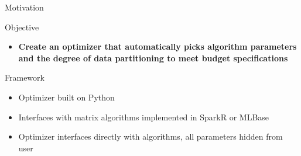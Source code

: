 \documentclass[final]{beamer}
\begin{document}
{\begin{frame}{}
\begin{center}
\begin{columns}[t]
\begin{column}{0.32\textwidth}
\begin{block}{\huge Motivation}
\end{block}

    \begin{block}{\huge Objective}
\vspace{.4cm}
\begin{itemize}
\item {\bf \large Create an optimizer that automatically picks algorithm parameters and the degree of data partitioning to meet budget specifications}
\end{itemize}

\vspace{.5cm}

\end{block}

\vspace{1.2cm}

    \begin{block}{\huge Framework}
\vspace{.5cm}
\begin{itemize}
\item Optimizer built on Python
\item Interfaces with matrix algorithms implemented in SparkR or MLBase
\item Optimizer interfaces directly with algorithms, all parameters hidden from user
\end{itemize}    
\begin{center}
\begin{figure}
\end{figure}
\end{center}
\end{block}


\vspace{1.2cm}

   
\end{column}


\end{columns}
\end{center}
\end{frame}}
\end{document}
